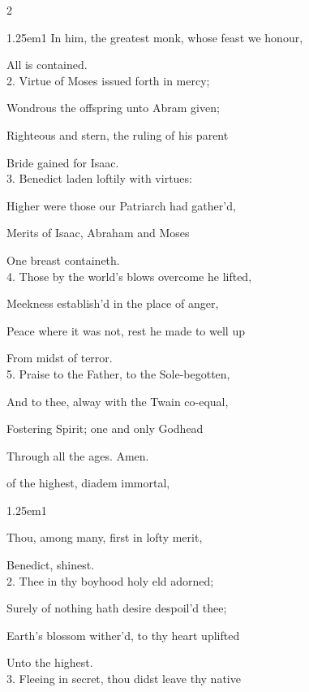 \begin{paracol}{2}
\begin{hangparas}{1.25em}{1}
In him, the greatest monk, whose feast we honour,

All is contained.\\

2. Virtue of Moses issued forth in mercy;

Wondrous the offspring unto Abram given;

Righteous and stern, the ruling of his parent

Bride gained for Isaac.\\

3. Benedict laden loftily with virtues:

Higher were those our Patriarch had gather'd,

Merits of Isaac, Abraham and Moses

One breast containeth.\\

4. Those by the world’s blows overcome he lifted,

Meekness establish'd in the place of anger,

Peace where it was not, rest he made to well up

From midst of terror.\\

5. Praise to the Father, to the Sole-begotten,

And to thee, alway with the Twain co-equal,

Fostering Spirit; one and only Godhead

Through all the ages. Amen.
\end{hangparas}

	\mattinsOfficeHymn\label{BenedictMattins}

 of the highest, diadem immortal,

\begin{hangparas}{1.25em}{1}

Thou, among many, first in lofty merit,

Benedict, shinest.\\

2. Thee in thy boyhood holy eld adorned;

Surely of nothing hath desire despoil'd thee;

Earth's blossom wither'd, to thy heart uplifted

Unto the highest.\\

3. Fleeing in secret, thou didst leave thy native


\end{hangparas}
\end{paracol}
